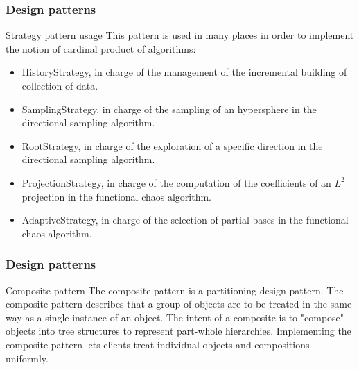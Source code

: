 \documentclass[8pt]{beamer}
\begin{document}
\begin{frame}
  \frametitle{Design patterns}
  \begin{block}{Strategy pattern usage}
    This pattern is used in many places in order to implement the notion of cardinal product of algorithms:
    \begin{itemize}
    \item \alert{HistoryStrategy}, in charge of the management of the incremental building of collection of data.
    \item \alert{SamplingStrategy}, in charge of the sampling of an hypersphere in the directional sampling algorithm.
    \item \alert{RootStrategy}, in charge of the exploration of a specific direction in the directional sampling algorithm.
    \item \alert{ProjectionStrategy}, in charge of the computation of the coefficients of an $L^2$ projection in the functional chaos algorithm.
    \item \alert{AdaptiveStrategy}, in charge of the selection of partial bases in the functional chaos algorithm.
    \end{itemize}
  \end{block}
\end{frame}

\begin{frame}
  \frametitle{Design patterns}
  \begin{block}{Composite pattern}
    The \alert{composite pattern} is a partitioning design pattern. The composite pattern describes that a group of objects are to be treated in the same way as a single instance of an object. The intent of a composite is to "compose" objects into tree structures to represent part-whole hierarchies. Implementing the composite pattern lets clients treat individual objects and compositions uniformly.
  \end{block}
  \vspace{1mm}
  \centering {}
\end{frame}
\end{document}
